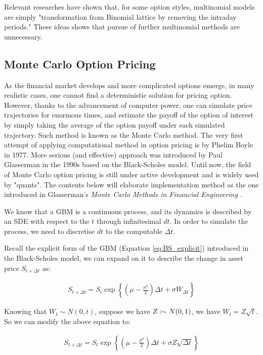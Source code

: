Relevant researches \cite{SI2019} have shown that, for some option styles, multinomial models are simply "transformation from Binomial lattice by removing the intraday periods." These ideas shows that pursue of further multinomial methods are unnecessary.

\subsection{Monte Carlo Option Pricing}

As the financial market develops and more complicated options emerge, in many realistic cases, one cannot find a deterministic solution for pricing option. However, thanks to the advancement of computer power, one can simulate price trajectories for enormous times, and estimate the payoff of the option of interest by simply taking the average of the option payoff under each simulated trajectory. Such method is known as the Monte Carlo method. The very first attempt of applying computational method in option pricing is by Phelim Boyle in 1977. More serious (and effective) approach was introduced by Paul Glasserman in the 1990s based on the Black-Scholes model. Until now, the field of Monte Carlo option pricing is still under active development and is widely used by "quants". The contents below will elaborate implementation method as the one introduced in Glasserman's \textit{Monte Carlo Methods in Financial Engineering} \cite{Glasserman2003}.

We know that a GBM is a continuous process, and its dynamics is described by an SDE with respect to the $t$ through infinitesimal $dt$. In order to simulate the process, we need to discretise $dt$ to the computable $\Delta t$.

Recall the explicit form of the GBM (Equation \ref{eq:BS_explicit}) introduced in the Black-Scholes model, we can expand on it to describe the change in asset price $S_{t+\Delta t}$ as:

\begin{align*}
S_{t+\Delta t} = S_t\exp{\left\{(\mu-\frac{\sigma^2}{2})\Delta t+\sigma W_{\Delta t}\right\}}
\end{align*}

Knowing that $W_t\sim N(0,t)$, suppose we have $Z\colonsim N(0,1)$, we have $W_t=Z\sqrt{t}$. So we can modify the above equation to:

\begin{align*}
S_{t+\Delta t} = S_t\exp{\left\{(\mu-\frac{\sigma^2}{2})\Delta t+\sigma Z \sqrt{\Delta t}\right\}}
\end{align*}

